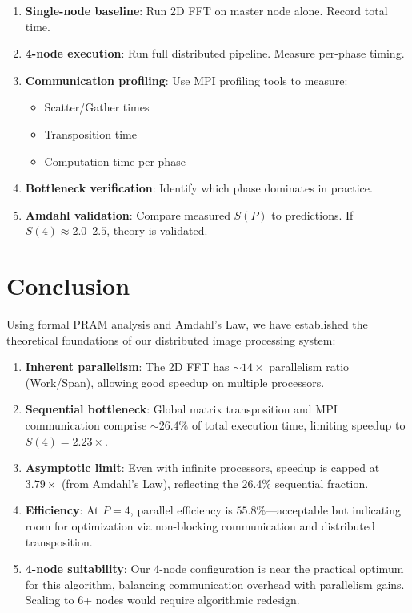 \documentclass[11pt,a4paper]{article}
\begin{document}
\begin{enumerate}
    \item \textbf{Single-node baseline}: Run 2D FFT on master node alone. Record total time.
    \item \textbf{4-node execution}: Run full distributed pipeline. Measure per-phase timing.
    \item \textbf{Communication profiling}: Use MPI profiling tools to measure:
        \begin{itemize}
            \item Scatter/Gather times
            \item Transposition time
            \item Computation time per phase
        \end{itemize}
    \item \textbf{Bottleneck verification}: Identify which phase dominates in practice.
    \item \textbf{Amdahl validation}: Compare measured $S(P)$ to predictions. If $S(4) \approx 2.0\text{–}2.5$, theory is validated.
\end{enumerate}

\section{Conclusion}

Using formal PRAM analysis and Amdahl's Law, we have established the theoretical foundations of our distributed image processing system:

\begin{enumerate}
    \item \textbf{Inherent parallelism}: The 2D FFT has $\sim 14\times$ parallelism ratio (Work/Span), allowing good speedup on multiple processors.
    
    \item \textbf{Sequential bottleneck}: Global matrix transposition and MPI communication comprise $\sim 26.4\%$ of total execution time, limiting speedup to $S(4) = 2.23\times$.
    
    \item \textbf{Asymptotic limit}: Even with infinite processors, speedup is capped at $3.79\times$ (from Amdahl's Law), reflecting the 26.4\% sequential fraction.
    
    \item \textbf{Efficiency}: At $P=4$, parallel efficiency is $55.8\%$—acceptable but indicating room for optimization via non-blocking communication and distributed transposition.
    
    \item \textbf{4-node suitability}: Our 4-node configuration is near the practical optimum for this algorithm, balancing communication overhead with parallelism gains. Scaling to 6+ nodes would require algorithmic redesign.
\end{enumerate}
\end{document}

